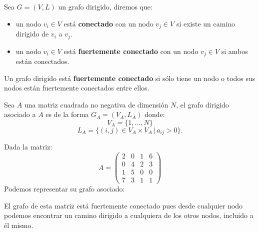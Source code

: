 \begin{definition}
    Sea $G=(V,L)$ un grafo dirigido, diremos que:
    \begin{itemize}
        \item un nodo $v_i\in V$ está \textbf{conectado} con un nodo $v_j\in V$ si existe un camino dirigido de $v_i$ a $v_j$.
        \item un nodo $v_i\in V$ está \textbf{fuertemente conectado} con un nodo $v_j\in V$ si ambos están conectados.
    \end{itemize}
    Un grafo dirigido está \textbf{fuertemente conectado} si sólo tiene un nodo o todos sus nodos están fuertemente conectados entre ellos.
\end{definition}

\begin{definition}
    Sea $A$ una matriz cuadrada no negativa de dimensión $N$, el grafo dirigido asociado a $A$ es de la forma $G_A=(V_A,L_A)$ donde:
    \[V_A=\{1,\dots,N\}\] 
    \[L_A=\{(i,j)\in V_A\times V_A \,|\, a_{ij}>0\}.\]
\end{definition}

\begin{exampleth}
    Dada la matriz:
    \[A=\begin{pmatrix}
        2 & 0 & 1 & 6 \\
        0 & 4 & 2 & 3 \\
        1 & 5 & 0 & 0 \\
        7 & 3 & 1 & 1 
    \end{pmatrix}\]
    Podemos representar su grafo asociado:
    \begin{center}
    \end{center}
    El grafo de esta matriz está fuertemente conectado pues desde cualquier nodo podemos encontrar un camino dirigido a cualquiera de los otros nodos, incluido a él mismo.
\end{exampleth}

